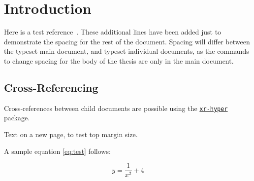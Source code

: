 \documentclass[\main/thesis.tex]{subfiles}
\begin{document}
\chapter{Introduction}

Here is a test reference~\cite{Knuth68:art_of_programming}.
These additional lines have been added just to demonstrate the spacing
for the rest of the document. Spacing will differ between the typeset main
document, and typeset individual documents, as the commands
to change spacing for the body of the thesis are only in the main document.

\section{Cross-Referencing}\label{sec:crossRef}

Cross-references between child documents are possible using the
\href{https://ctan.org/pkg/xr-hyper}{\texttt{xr-hyper}} package.

\newpage

Text on a new page, to test top margin size.

A sample equation \eqref{eq:test} follows:

\begin{equation}
y = \frac{1}{x^2} + 4 \label{eq:test}
\end{equation}
\end{document}
